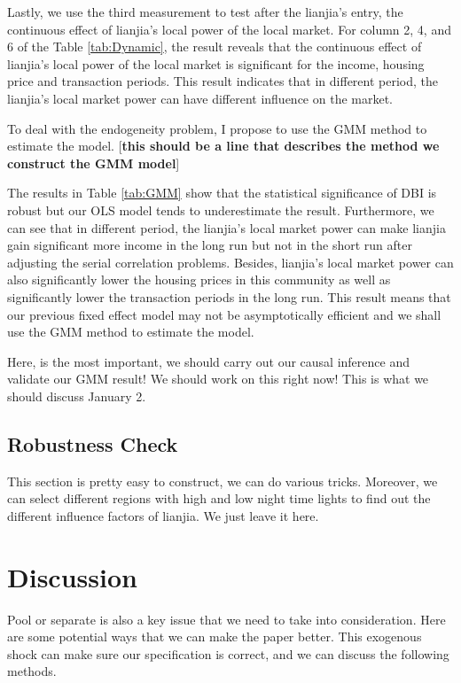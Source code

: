 \documentclass[12pt]{article}
\begin{document}
Lastly, we use the third measurement to test after the lianjia's entry, the continuous effect of lianjia's local power of the local market. For column 2, 4, and 6 of the Table \ref{tab:Dynamic}, the result reveals that the continuous effect of lianjia's local power of the local market is significant for the income, housing price and transaction periods. This result indicates that in different period, the lianjia's local market power can have different influence on the market.

To deal with the endogeneity problem, I propose to use the GMM method to estimate the model. [\textbf{this should be a line that describes the method we construct the GMM model}]

The results in Table \ref{tab:GMM} show that the statistical significance of DBI is robust but our OLS model tends to underestimate the result. Furthermore, we can see that in different period, the lianjia's local market power can make lianjia gain significant more income in the long run but not in the short run after adjusting the serial correlation problems. Besides, lianjia's local market power can also significantly lower the housing prices in this community as well as significantly lower the transaction periods in the long run. This result means that our previous fixed effect model may not be asymptotically efficient and we shall use the GMM method to estimate the model.

Here, is the most important, we should carry out our causal inference and validate our GMM result! We should work on this right now! This is what we should discuss January 2.

\subsection{Robustness Check \label{sec:robustness}}

This section is pretty easy to construct, we can do various tricks. Moreover, we can select different regions with high and low night time lights to find out the different influence factors of lianjia. We just leave it here.

\section{Discussion \label{sec:discussion}}

Pool or separate is also a key issue that we need to take into consideration. Here are some potential ways that we can make the paper better. This exogenous shock can make sure our specification is correct, and we can discuss the following methods.
\end{document}
